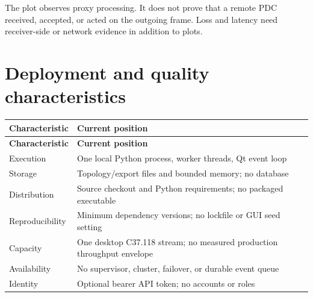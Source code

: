 The plot observes proxy processing. It does not prove that a remote PDC received, accepted, or acted on the outgoing frame. Loss and latency need receiver-side or network evidence in addition to plots.

\section*{Deployment and quality characteristics}
\begingroup
\fontsize{8.7}{11.8}\selectfont
\setlength{\tabcolsep}{5pt}
\renewcommand{\arraystretch}{1.23}
\begin{longtable}{@{}>{\raggedright\arraybackslash}p{}>{\raggedright\arraybackslash}p{}@{}}
\rowcolor{navy} \color{white}\bfseries Characteristic & \color{white}\bfseries Current position \\
\endfirsthead
\rowcolor{navy} \color{white}\bfseries Characteristic & \color{white}\bfseries Current position \\
\endhead
\endfoot
\rowcolor{pale}
Execution & One local Python process, worker threads, Qt event loop \\
Storage & Topology/export files and bounded memory; no database \\
\rowcolor{pale}
Distribution & Source checkout and Python requirements; no packaged executable \\
Reproducibility & Minimum dependency versions; no lockfile or GUI seed setting \\
\rowcolor{pale}
Capacity & One desktop C37.118 stream; no measured production throughput envelope \\
Availability & No supervisor, cluster, failover, or durable event queue \\
\rowcolor{pale}
Identity & Optional bearer API token; no accounts or roles \\
\end{longtable}
\endgroup

